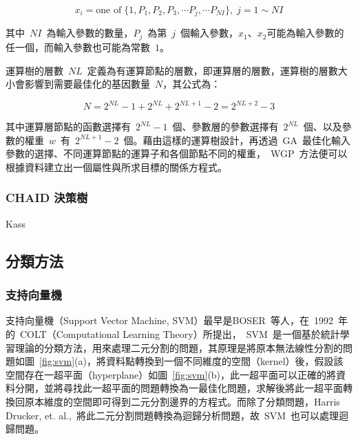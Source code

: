 \begin{equation} x_i = \text{one of}\; \{1, P_1, P_2, P_3, \cdots P_j, \cdots P_{NI}\},\; j = 1 \sim NI \label{eq:WGP-xi}\end{equation}

其中~$NI$~為輸入參數的數量，$P_j$~為第~$j$~個輸入參數，$x_1$、$x_2$可能為輸入參數的任一個，而輸入參數也可能為常數~$1$。

運算樹的層數~$NL$~定義為有運算節點的層數，即運算層的層數，運算樹的層數大小會影響到需要最佳化的基因數量~$N$，其公式為：

\begin{equation} N = 2^{NL} - 1 + 2^{NL} + 2^{NL + 1} - 2 = 2^{NL + 2} - 3  \label{eq:WGP-N}\end{equation}


其中運算層節點的函數選擇有~$2^{NL} - 1$~個、參數層的參數選擇有~$2^{NL}$~個、以及參數的權重~$w$~有~$2^{NL + 1} - 2$~個。藉由這樣的運算樹設計，再透過~GA~最佳化輸入參數的選擇、不同運算節點的運算子和各個節點不同的權重，~WGP~方法便可以根據資料建立出一個屬性與所求目標的關係方程式。


\subsubsection{CHAID 決策樹}

Kass\cite{kass1980exploratory}

\subsection{分類方法}

\subsubsection{支持向量機}

支持向量機（Support Vector Machine, SVM）最早是BOSER~\cite{boser1992}等人，在~1992~年的~COLT（Computational Learning Theory）所提出，~SVM~是一個基於統計學習理論的分類方法，用來處理二元分割的問題，其原理是將原本無法線性分割的問題如圖~\ref{fig:svm}(a)\cite{verplancke2008support}，將資料點轉換到一個不同維度的空間（kernel）後，假設該空間存在一超平面（hyperplane）如圖~\ref{fig:svm}(b)，此一超平面可以正確的將資料分開，並將尋找此一超平面的問題轉換為一最佳化問題，求解後將此一超平面轉換回原本維度的空間即可得到二元分割邊界的方程式。而除了分類問題，Harris Drucker, et. al.,\cite{drucker1997support}~將此二元分割問題轉換為迴歸分析問題，故~SVM~也可以處理迴歸問題。

